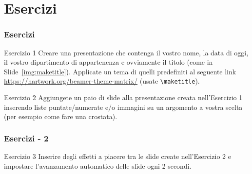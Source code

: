 \section{Esercizi}
\begin{frame}

  \frametitle{Esercizi}

  \begin{block}{Esercizio 1}
    Creare una presentazione che contenga il vostro nome, la data di oggi, il 
vostro dipartimento di appartenenza e ovviamente il titolo (come in 
Slide~\ref{img:maketitle}). Applicate un tema di quelli predefiniti al seguente 
link \url{https://hartwork.org/beamer-theme-matrix/} (usate 
\texttt{\textbackslash maketitle}).
  \end{block}

  \begin{block}{Esercizio 2}
    Aggiungete un paio di slide alla presentazione creata nell'Esercizio 1 
inserendo liste puntate/numerate e/o immagini su un argomento a vostra scelta 
(per esempio come fare una crostata).
  \end{block}
\end{frame}

\begin{frame}

  \frametitle{Esercizi - 2}
 
  \begin{block}{Esercizio 3}
    Inserire degli effetti a piacere tra le slide create nell'Esercizio 2 e 
impostare l'avanzamento automatico delle slide ogni 2 secondi.
  \end{block}
\end{frame}
